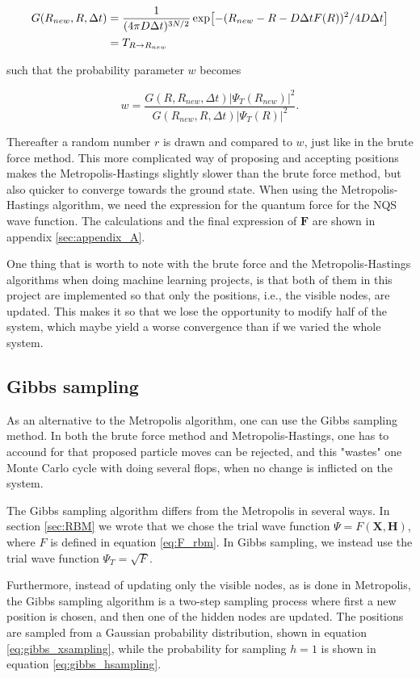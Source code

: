 \documentclass[norsk,a4paper,12pt]{article}
\begin{document}
\begin{align}
G(R_{new},R,\Delta t)&=\frac{1}{(4\pi D\Delta t)^{3N/2}}\exp[-(R_{new} - R - D\Delta tF(R))^2/4D\Delta t]\notag\\
&=T_{R\rightarrow R_{new}}
\end{align}

such that the probability parameter $w$ becomes 

\begin{equation}
w = \frac{G(R,R_{new},\Delta t)|\Psi_T(R_{new})|^2}{G(R_{new},R,\Delta t)|\Psi_T(R)|^2}.
\end{equation}

Thereafter a random number $r$ is drawn and compared to $w$, just like in the brute force method. This more complicated way of proposing and accepting positions makes the Metropolis-Hastings slightly slower than the brute force method, but also quicker to converge towards the ground state. When using the Metropolis-Hastings algorithm, we need the expression for the quantum force for the NQS wave function. The calculations and the final expression of $\boldsymbol{F}$ are shown in appendix \ref{sec:appendix_A}.
\par 
\vspace{3mm}

One thing that is worth to note with the brute force and the Metropolis-Hastings algorithms when doing machine learning projects, is that both of them in this project are implemented so that only the positions, i.e., the visible nodes, are updated. This makes it so that we lose the opportunity to modify half of the system, which maybe yield a worse convergence than if we varied the whole system.


\subsection{Gibbs sampling}
As an alternative to the Metropolis algorithm, one can use the Gibbs sampling method. In both the brute force method and Metropolis-Hastings, one has to accound for that proposed particle moves can be rejected, and this "wastes" one Monte Carlo cycle with doing several flops, when no change is inflicted on the system. \par 
\vspace{3mm}
The Gibbs sampling algorithm differs from the Metropolis in several ways. In section \ref{sec:RBM} we wrote that we chose the trial wave function $\Psi = F(\boldsymbol{X},\boldsymbol{H})$, where $F$ is defined in equation \ref{eq:F_rbm}. In Gibbs sampling, we instead use the trial wave function $\Psi_T = \sqrt{F}$. 
\par 
\vspace{3mm}
Furthermore, instead of updating only the visible nodes, as is done in Metropolis, the Gibbs sampling algorithm is a two-step sampling process where first a new position is chosen, and then one of the hidden nodes are updated. The positions are sampled from a Gaussian probability distribution, shown in equation \ref{eq:gibbs_xsampling}, while the probability for sampling $h=1$ is shown in equation \ref{eq:gibbs_hsampling}.
\end{document}
